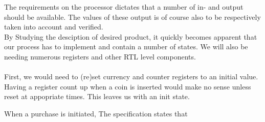 The requirements on the processor dictates that a number of in- and output should be available. The values of these output is of course also to be respectively taken into account and verified.\\
By Studying the desciption of desired product, it quickly becomes apparent that our process has to implement and contain a number of states. We will also be needing numerous registers and other RTL level components.\\\\
First, we would need to (re)set currency and counter registers to an initial value. Having a register count up when a coin is inserted would make no sense unless reset at appopriate times. This leaves us with an init state.





When a purchase is initiated, The specification states that 